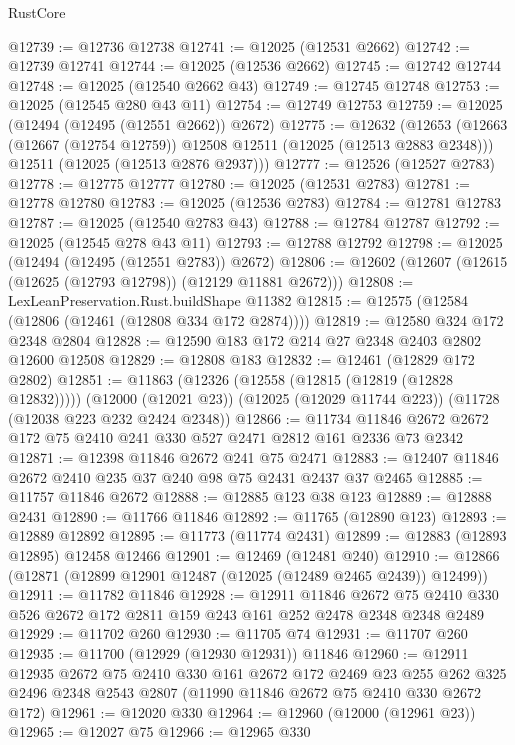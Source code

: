 \begin{lexlean}{RustCore}
\begin{coremodule}
@12739 := @12736 @12738
@12741 := @12025 (@12531 @2662)
@12742 := @12739 @12741
@12744 := @12025 (@12536 @2662)
@12745 := @12742 @12744
@12748 := @12025 (@12540 @2662 @43)
@12749 := @12745 @12748
@12753 := @12025 (@12545 @280 @43 @11)
@12754 := @12749 @12753
@12759 := @12025 (@12494 (@12495 (@12551 @2662)) @2672)
@12775 := @12632
    (@12653
      (@12663 (@12667 (@12754 @12759)) @12508 @12511 (@12025 (@12513 @2883 @2348)))
      @12511
      (@12025 (@12513 @2876 @2937)))
@12777 := @12526 (@12527 @2783)
@12778 := @12775 @12777
@12780 := @12025 (@12531 @2783)
@12781 := @12778 @12780
@12783 := @12025 (@12536 @2783)
@12784 := @12781 @12783
@12787 := @12025 (@12540 @2783 @43)
@12788 := @12784 @12787
@12792 := @12025 (@12545 @278 @43 @11)
@12793 := @12788 @12792
@12798 := @12025 (@12494 (@12495 (@12551 @2783)) @2672)
@12806 := @12602 (@12607 (@12615 (@12625 (@12793 @12798)) (@12129 @11881 @2672)))
@12808 := LexLeanPreservation.Rust.buildShape @11382
@12815 := @12575 (@12584 (@12806 (@12461 (@12808 @334 @172 @2874))))
@12819 := @12580 @324 @172 @2348 @2804
@12828 := @12590 @183 @172 @214 @27 @2348 @2403 @2802 @12600 @12508
@12829 := @12808 @183
@12832 := @12461 (@12829 @172 @2802)
@12851 := @11863
    (@12326 (@12558 (@12815 (@12819 (@12828 @12832)))))
    (@12000 (@12021 @23))
    (@12025 (@12029 @11744 @223))
    (@11728 (@12038 @223 @232 @2424 @2348))
@12866 := @11734 @11846 @2672 @2672 @172 @75 @2410 @241 @330 @527 @2471 @2812 @161 @2336 @73 @2342
@12871 := @12398 @11846 @2672 @241 @75 @2471
@12883 := @12407 @11846 @2672 @2410 @235 @37 @240 @98 @75 @2431 @2437 @37 @2465
@12885 := @11757 @11846 @2672
@12888 := @12885 @123 @38 @123
@12889 := @12888 @2431
@12890 := @11766 @11846
@12892 := @11765 (@12890 @123)
@12893 := @12889 @12892
@12895 := @11773 (@11774 @2431)
@12899 := @12883 (@12893 @12895) @12458 @12466
@12901 := @12469 (@12481 @240)
@12910 := @12866 (@12871 (@12899 @12901 @12487 (@12025 (@12489 @2465 @2439)) @12499))
@12911 := @11782 @11846
@12928 := @12911
    @11846
    @2672
    @75
    @2410
    @330
    @526
    @2672
    @172
    @2811
    @159
    @243
    @161
    @252
    @2478
    @2348
    @2348
    @2489
@12929 := @11702 @260
@12930 := @11705 @74
@12931 := @11707 @260
@12935 := @11700 (@12929 (@12930 @12931)) @11846
@12960 := @12911
    @12935
    @2672
    @75
    @2410
    @330
    @161
    @2672
    @172
    @2469
    @23
    @255
    @262
    @325
    @2496
    @2348
    @2543
    @2807
    (@11990 @11846 @2672 @75 @2410 @330 @2672 @172)
@12961 := @12020 @330
@12964 := @12960 (@12000 (@12961 @23))
@12965 := @12027 @75
@12966 := @12965 @330

\end{coremodule}
\end{lexlean}
